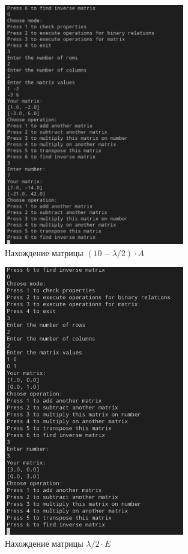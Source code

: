 \documentclass[bachelor, och, labwork]{shiza}
\begin{document}
        \begin{figure}[H]
            \centering
            \includegraphics[width=0.7\textwidth]{photo/3.png}
            \caption{Нахождение матрицы $(10 - \lambda / 2) \cdot A$}
        \end{figure}

        \begin{figure}[H]
            \centering
            \includegraphics[width=0.7\textwidth]{photo/4.png}
            \caption{Нахождение матрицы $\lambda / 2\cdot E$}
        \end{figure} 
\end{document}
